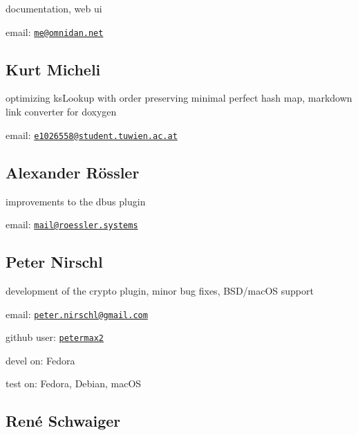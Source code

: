 documentation, web ui


\begin{DoxyItemize}
\item email\+: \href{mailto:me@omnidan.net}{\tt me@omnidan.\+net}
\end{DoxyItemize}

\subsection*{Kurt Micheli}

optimizing ks\+Lookup with order preserving minimal perfect hash map, markdown link converter for doxygen


\begin{DoxyItemize}
\item email\+: \href{mailto:e1026558@student.tuwien.ac.at}{\tt e1026558@student.\+tuwien.\+ac.\+at}
\end{DoxyItemize}

\subsection*{Alexander Rössler}

improvements to the dbus plugin


\begin{DoxyItemize}
\item email\+: \href{mailto:mail@roessler.systems}{\tt mail@roessler.\+systems}
\end{DoxyItemize}

\subsection*{Peter Nirschl}

development of the crypto plugin, minor bug fixes, B\+S\+D/mac\+OS support


\begin{DoxyItemize}
\item email\+: \href{mailto:peter.nirschl@gmail.com}{\tt peter.\+nirschl@gmail.\+com}
\item github user\+: \href{http://github.com/petermax2}{\tt petermax2}
\item devel on\+: Fedora
\item test on\+: Fedora, Debian, mac\+OS
\end{DoxyItemize}

\subsection*{René Schwaiger}


